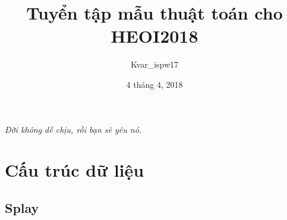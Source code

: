 \documentclass[11pt]{article}
\title{Tuyển tập mẫu thuật toán cho HEOI2018}
\author{Kvar\_ispw17}
\date{4 tháng 4, 2018}
\begin{document}
\maketitle

\begin{center}
\textit{Đời không dễ chịu, rồi bạn sẽ yêu nó.}
\end{center}

\tableofcontents

\section{Cấu trúc dữ liệu}

\subsection{Splay}
\end{document}
